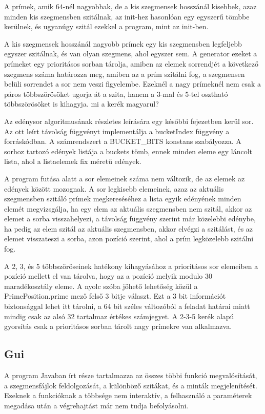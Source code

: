 A prímek, amik $64$-nél nagyobbak, de a
kis szegmensek hosszánál kisebbek, azaz minden kis szegmensben
szitálnak, az init-hez hasonlóan egy egyszerű tömbbe
kerülnek, és ugyanúgy szitál ezekkel a program, mint
az init-ben.

A kis szegmensek hosszánál nagyobb prímek
egy kis szegmensben legfeljebb egyszer szitálnak,
és van olyan szegmens, ahol egyszer sem.
A generator ezeket a prímeket egy prioritásos
sorban tárolja, amiben az elemek sorrendjét
a következő szegmens száma határozza meg,
amiben az a prím szitálni fog, a szegmensen
belüli sorrendet a sor nem veszi figyelembe.
Ezeknél a nagy prímeknél nem csak a páros
többszörösöket ugorja át a szita, hanem
a 3-mal és 5-tel osztható többszörösöket is
kihagyja. {\color{red}mi a kerék magyarul?}

Az edénysor algoritmusának részletes leírására egy későbbi fejezetben kerül sor.
Az ott leírt távolság függvényt implementálja a bucketIndex függvény
a forráskódban. A számrendszert a BUCKET\_BITS konstans szabályozza.
A sorhoz tartozó edények listája a buckets tömb, ennek minden eleme
egy láncolt lista, ahol a listaelemek fix méretű edények.

A program futása alatt a sor elemeinek száma nem változik,
de az elemek az edények között mozognak. A sor legkisebb elemeinek,
azaz az aktuális szegmensben szitáló prímek megkereséséhez
a lista egyik edényének minden elemét
megvizsgálja, ha egy elem az aktuális
szegmensben nem szitál, akkor az elemet a sorba visszahelyezi,
a távolság függvény szerint már közelebbi edénybe, ha pedig
az elem szitál az aktuális szegmensben, akkor elvégzi a szitálást,
és az elemet visszateszi a sorba, azon pozíció szerint, ahol a
prím legközelebb szitálni fog.

A 2, 3, és 5 többszöröseinek hatékony kihagyásához
a prioritásos sor elemeiben a pozíció mellett el van tárolva,
hogy az a pozíció melyik modulo 30 maradékosztály eleme.
A nyolc szóba jöhető lehetőség közül a PrimePosition.prime mező
felső 3 bitje választ. Ezt a 3 bit információt biztonsággal
lehet itt tárolni, a 64 bit széles változóból a feladat határai
miatt mindig csak az alsó 32 tartalmaz értékes számjegyet.
A {\color{red}2-3-5 kerék} alapú gyorsítás csak a prioritásos sorban
tárolt nagy prímekre van alkalmazva.

\subsection{Gui}

A program Javaban írt része tartalmazza az összes többi funkció megvalósítását, a szegmensfájlok feldolgozását, a különböző szitákat, és a minták megjelenítését.
Ezeknek a funkcióknak a többsége nem interaktív, a felhasználó a paraméterek megadása után a végrehajtást már nem tudja befolyásolni.


